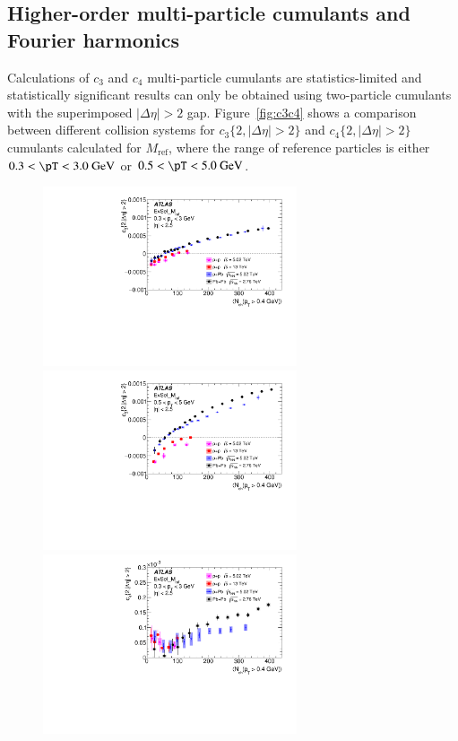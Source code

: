\documentclass[cernpreprint,texlive=2014,txfonts,UKenglish]{latex/atlasdoc}
\begin{document}
\subsection{Higher-order multi-particle cumulants and Fourier harmonics}
\label{sec:v3v4}
Calculations of $c_3$ and $c_4$ multi-particle cumulants are statistics-limited and statistically significant results can only be obtained using two-particle cumulants with the superimposed $|\Delta\eta|>2$ gap. Figure~\ref{fig:c3c4} shows a comparison between different collision systems for $c_3\{2,|\Delta\eta|>2\}$ and $c_4\{2,|\Delta\eta|>2\}$ cumulants calculated for $M_{\mathrm{ref}}$, where the \pT range of reference particles is either ${0.3 < \pT < 3.0~\mathrm{GeV}}$ or ${0.5 < \pT < 5.0~\mathrm{GeV}}$.   
\begin{figure}[ht!]
\begin{center}
\includegraphics[width=75mm]{fig_12a.pdf}
\includegraphics[width=75mm]{fig_12b.pdf}
\includegraphics[width=75mm]{fig_12c.pdf}

\end{center}
\end{figure}
\end{document}
